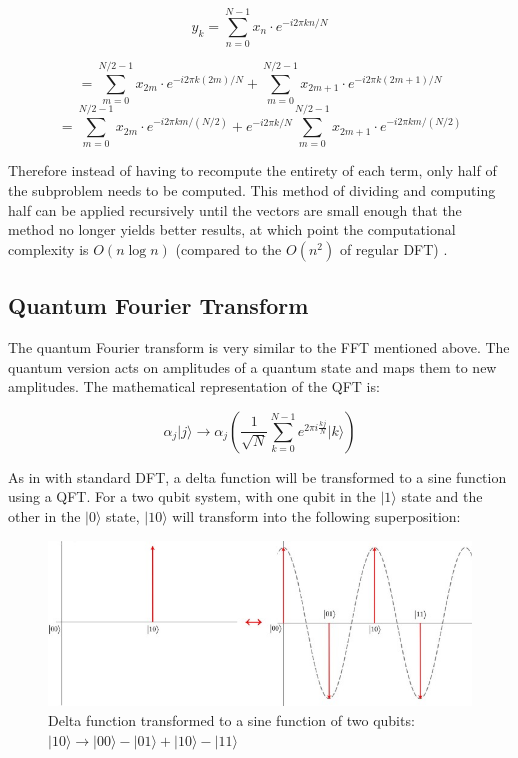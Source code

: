 \documentclass{article}
\begin{document}
\begin{equation}
y_{k}=\sum_{n=0}^{N-1} x_{n} \cdot e^{-i 2 \pi k n / N}
\end{equation}

\[=\sum_{m=0}^{N / 2-1} x_{2 m} \cdot e^{-i 2 \pi k(2 m) / N}+\sum_{m=0}^{N / 2-1} x_{2 m+1} \cdot e^{-i 2 \pi k(2 m+1) / N}\]
\[=\sum_{m=0}^{N / 2-1} x_{2 m} \cdot e^{-i 2 \pi k m /(N / 2)}+e^{-i 2 \pi k / N} \sum_{m=0}^{N / 2-1} x_{2 m+1} \cdot e^{-i 2 \pi k m /(N / 2)}\]

\noindent Therefore instead of having to recompute the entirety of each term, only half of the subproblem needs to be computed. This method of dividing and computing half can be applied recursively until the vectors are small enough that the method no longer yields better results, at which point the computational complexity is $O(n\log{}n)$ (compared to the $O(n^2)$ of regular DFT) \cite{jvdp}.

\subsection{Quantum Fourier Transform}
The quantum Fourier transform is very similar to the FFT mentioned above. The quantum version acts on amplitudes of a quantum state and maps them to new amplitudes. The mathematical representation of the QFT is:

\begin{equation}
\alpha_{j}|j\rangle \rightarrow \alpha_{j}\left(\frac{1}{\sqrt{N}} \sum_{k=0}^{N-1} e^{2 \pi i \frac{k j}{N}}|k\rangle\right)
\end{equation}

As in with standard DFT, a delta function will be transformed to a sine function using a QFT. For a two qubit system, with one qubit in the $|1\rangle$ state and the other in the $|0\rangle$ state, $|10\rangle$ will transform into the following superposition: 

\begin{figure}[!htb]
\includegraphics[scale=0.4]{../images/fourier}
  \centering
  \caption{Delta function transformed to a sine function of two qubits: $|10\rangle \rightarrow |00\rangle-|01\rangle+|10\rangle-|11\rangle$ \cite{jonathan}}
\end{figure}
\end{document}
